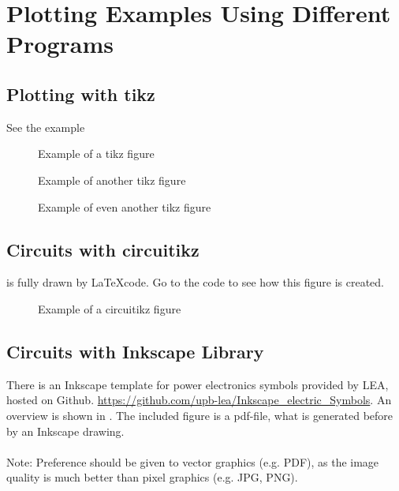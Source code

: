 \chapter{Plotting Examples Using Different Programs} 
\label{cha:evaluation}

\section{Plotting with tikz}

See the example 
\begin{figure}[ht]
    \centering
    
    \caption{Example of a tikz figure}
    \label{fig:tikz_example_01}
\end{figure}
\begin{figure}[ht]
    \centering
    
    \caption{Example of another tikz figure}
    \label{fig:tikz_example_02}
\end{figure}
\begin{figure}[ht]
    \centering
    
    \caption{Example of even another tikz figure}
    \label{fig:tikz_example_03}
\end{figure}



\section{Circuits with circuitikz}
 is fully drawn by \LaTeX code. Go to the code to see how this figure is created.
\begin{figure}[ht]
    \centering
    
    \caption{Example of a circuitikz figure}
    \label{fig:circuitikz_example}
\end{figure}

\section{Circuits with Inkscape Library}
There is an Inkscape template for power electronics symbols provided by LEA, hosted on Github. \href{https://github.com/upb-lea/Inkscape_electric_Symbols}{https://github.com/upb-lea/Inkscape\_electric\_Symbols}. An overview is shown in . The included figure is a pdf-file, what is generated before by an Inkscape drawing.
\\ \\
Note: Preference should be given to vector graphics (e.g. PDF), as the image quality is much better than pixel graphics (e.g. JPG, PNG).

